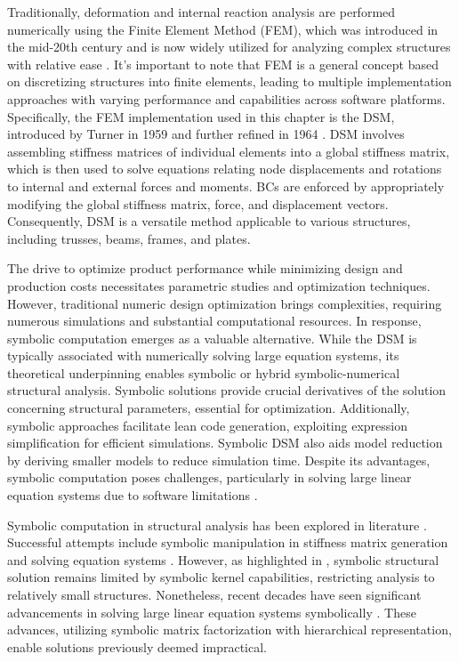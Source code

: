 Traditionally, deformation and internal reaction analysis are performed numerically using the Finite Element Method (\ac{FEM}), which was introduced in the mid-20th century and is now widely utilized for analyzing complex structures with relative ease \cite{felippa2001historical}. It's important to note that \ac{FEM} is a general concept based on discretizing structures into finite elements, leading to multiple implementation approaches with varying performance and capabilities across software platforms. Specifically, the \ac{FEM} implementation used in this chapter is the \ac{DSM}, introduced by Turner in 1959 \cite{turner1959direct} and further refined in 1964 \cite{turner1964further}. DSM involves assembling stiffness matrices of individual elements into a global stiffness matrix, which is then used to solve equations relating node displacements and rotations to internal and external forces and moments. \acp{BC} are enforced by appropriately modifying the global stiffness matrix, force, and displacement vectors. Consequently, DSM is a versatile method applicable to various structures, including trusses, beams, frames, and plates.

The drive to optimize product performance while minimizing design and production costs necessitates parametric studies and optimization techniques. However, traditional numeric design optimization brings complexities, requiring numerous simulations and substantial computational resources. In response, symbolic computation emerges as a valuable alternative. While the \ac{DSM} is typically associated with numerically solving large equation systems, its theoretical underpinning enables symbolic or hybrid symbolic-numerical structural analysis. Symbolic solutions provide crucial derivatives of the solution concerning structural parameters, essential for optimization. Additionally, symbolic approaches facilitate lean code generation, exploiting expression simplification for efficient simulations. Symbolic \ac{DSM} also aids model reduction by deriving smaller models to reduce simulation time. Despite its advantages, symbolic computation poses challenges, particularly in solving large linear equation systems due to software limitations \cite{carette2006linear, zhou2007symbolic}.

Symbolic computation in structural analysis has been explored in literature \cite{noor1979computerized, pavlovic2003symbolic}. Successful attempts include symbolic manipulation in stiffness matrix generation \cite{cecchi1977automatic} and solving equation systems \cite{ioakimidis1992application, beltzer2012variational}. However, as highlighted in \cite{pavlovic2003symbolic}, symbolic structural solution remains limited by symbolic kernel capabilities, restricting analysis to relatively small structures. Nonetheless, recent decades have seen significant advancements in solving large linear equation systems symbolically \cite{carette2006linear, zhou2007symbolic}. These advances, utilizing symbolic matrix factorization with hierarchical representation, enable solutions previously deemed impractical.

